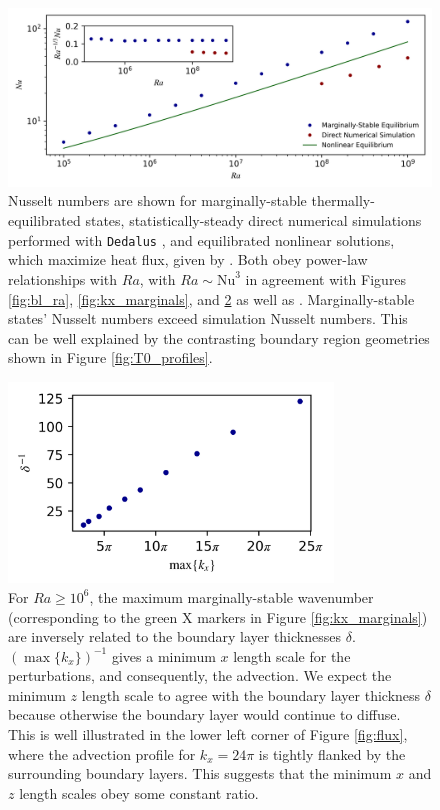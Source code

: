 \documentclass[reprint,amsmath,amssymb,aps]{revtex4-1}
\newcommand\Nu{\mathrm{Nu}}
\begin{document}
\begin{figure}
    \label{fig:flux}
    \vspace{0.4in}
    \includegraphics[width=7.1in]{nu_ra.PNG}
    \caption{Nusselt numbers are shown for marginally-stable thermally-equilibrated states, statistically-steady direct numerical simulations performed with \texttt{Dedalus} \cite{Anders_cd}, and equilibrated nonlinear solutions, which maximize heat flux, given by \cite{Waleffe}. Both obey power-law relationships with $Ra$, with $Ra \sim \Nu^3$ in agreement with Figures \ref{fig:bl_ra}, \ref{fig:kx_marginals}, and \ref{fig:del_inv} as well as \cite{Malkus}. Marginally-stable states' Nusselt numbers exceed simulation Nusselt numbers. This can be well explained by the contrasting boundary region geometries shown in Figure \ref{fig:T0_profiles}.}%
    \label{fig:nu_vs_ra}%
\end{figure}

\begin{figure}[h]
    \centering
    \includegraphics[width=3.4in]{del_kx_inv.png}
    \caption{For $Ra \geq 10^6$, the maximum marginally-stable wavenumber (corresponding to the green X markers in Figure \ref{fig:kx_marginals}) are inversely related to the boundary layer thicknesses $\delta$. $(\max \{ k_x \})^{-1}$ gives a minimum $x$ length scale for the perturbations, and consequently, the advection. We expect the minimum $z$ length scale to agree with the boundary layer thickness $\delta$ because otherwise the boundary layer would continue to diffuse. This is well illustrated in the lower left corner of Figure \ref{fig:flux}, where the advection profile for $k_x = 24\pi$ is tightly flanked by the surrounding boundary layers. This suggests that the minimum $x$ and $z$ length scales obey some constant ratio.}
    \label{fig:del_inv}
\end{figure}
\end{document}
